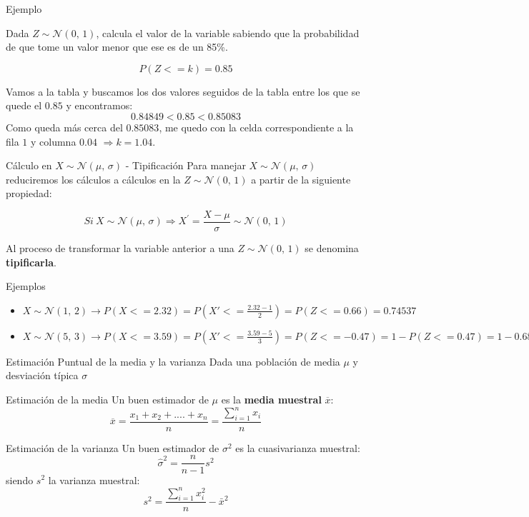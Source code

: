 \documentclass[11pt,handout]{beamer}
\begin{document}
\begin{frame}{Ejemplo}

Dada $Z \sim \mathcal{N}(0,\,1)$, calcula el valor de la variable sabiendo que la probabilidad de que tome un valor menor que ese es de un 85\%. 

$$P(Z<=k)=0.85$$
    \begin{center}
        
    \end{center}

Vamos a la tabla y buscamos los dos valores seguidos de la tabla entre los que se quede el $0.85$ y encontramos:
$$0.84849 < 0.85 < 0.85083 $$
Como queda más cerca del $0.85083$, me quedo con la celda correspondiente a la fila $1$ y columna $0.04$  $\Rightarrow k=1.04$.
\end{frame}

\begin{frame}{Cálculo en $X \sim \mathcal{N}(\mu,\,\sigma)$ - Tipificación}
Para manejar $X \sim \mathcal{N}(\mu,\,\sigma)$ reduciremos los cálculos a cálculos en la $Z \sim \mathcal{N}(0,\,1)$ a partir de la siguiente propiedad:

\begin{block}{}
$$ Si \  X \sim \mathcal{N}(\mu,\,\sigma) \Rightarrow X^{'}=\frac{X - \mu}{\sigma} \sim \mathcal{N}(0,\,1) $$
\end{block}

\pause

Al proceso de transformar la variable anterior a una $Z\sim \mathcal{N}(0,\,1)$ se denomina \textbf{tipificarla}.


\end{frame}



\begin{frame}{Ejemplos}

\begin{itemize}[<+->]
    \item $X \sim \mathcal{N}(1,\,2) \to P(X<=2.32)=P(X'<=\frac{2.32-1}{2})=P(Z<=0.66)=0.74537$
    \item $X \sim \mathcal{N}(5,\,3) \to P(X<=3.59)=P(X'<=\frac{3.59-5}{3})=P(Z<=-0.47)=1-P(Z<=0.47)=1-0.68082=0.31918$
\end{itemize}
\end{frame}


\begin{frame}{Estimación Puntual de la media y la varianza}
Dada una población de media $\mu$ y desviación típica $\sigma$
\begin{block}{Estimación de la media}
 Un buen estimador de $\mu$ es la \textbf{media muestral} $\overline{x}$:
$$\overline{x}= \frac{x_1 + x_2 + ....+x_n} {n}=\frac{{\sum_{i=1}^n x_i }}{n}$$
\end{block}
\pause
\begin{block}{Estimación de la varianza}
Un buen estimador de $\sigma^2$ es la cuasivarianza muestral:
$$\widehat{\sigma}^2=\frac{n}{n-1}s^2$$
siendo $s^2$ la varianza muestral:
$$s^2=\frac{\sum_{i=1}^n x_i^2 }{n} - \bar x^2$$
\end{block}
\end{frame}
\end{document}

